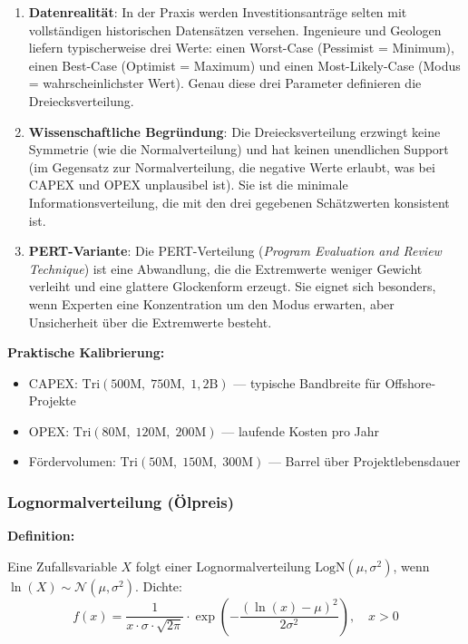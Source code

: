 \documentclass[12pt,a4paper]{article}
\begin{document}
\begin{enumerate}[label=\arabic*., itemsep=4pt]
  \item \textbf{Datenrealität}: In der Praxis werden Investitionsanträge selten mit vollständigen historischen Datensätzen versehen. Ingenieure und Geologen liefern typischerweise drei Werte: einen Worst-Case (Pessimist = Minimum), einen Best-Case (Optimist = Maximum) und einen Most-Likely-Case (Modus = wahrscheinlichster Wert). Genau diese drei Parameter definieren die Dreiecksverteilung.
  \item \textbf{Wissenschaftliche Begründung}: Die Dreiecksverteilung erzwingt keine Symmetrie (wie die Normalverteilung) und hat keinen unendlichen Support (im Gegensatz zur Normalverteilung, die negative Werte erlaubt, was bei CAPEX und OPEX unplausibel ist). Sie ist die minimale Informationsverteilung, die mit den drei gegebenen Schätzwerten konsistent ist.
  \item \textbf{PERT-Variante}: Die PERT-Verteilung (\textit{Program Evaluation and Review Technique}) ist eine Abwandlung, die die Extremwerte weniger Gewicht verleiht und eine glattere Glockenform erzeugt. Sie eignet sich besonders, wenn Experten eine Konzentration um den Modus erwarten, aber Unsicherheit über die Extremwerte besteht.
\end{enumerate}

\textbf{Praktische Kalibrierung:}
\begin{itemize}[itemsep=1pt]
  \item CAPEX: $\text{Tri}(500\text{M},\; 750\text{M},\; 1{,}2\text{B})$ — typische Bandbreite für Offshore-Projekte
  \item OPEX: $\text{Tri}(80\text{M},\; 120\text{M},\; 200\text{M})$ — laufende Kosten pro Jahr
  \item Fördervolumen: $\text{Tri}(50\text{M},\; 150\text{M},\; 300\text{M})$ — Barrel über Projektlebensdauer
\end{itemize}

\subsubsection{Lognormalverteilung (Ölpreis)}

\textbf{Definition:}

Eine Zufallsvariable $X$ folgt einer Lognormalverteilung $\text{LogN}(\mu, \sigma^2)$, wenn $\ln(X) \sim \mathcal{N}(\mu, \sigma^2)$. Dichte:
\begin{equation}
f(x) = \frac{1}{x \cdot \sigma \cdot \sqrt{2\pi}} \cdot \exp\!\left(-\frac{(\ln(x) - \mu)^2}{2\sigma^2}\right), \quad x > 0
\end{equation}
\end{document}
